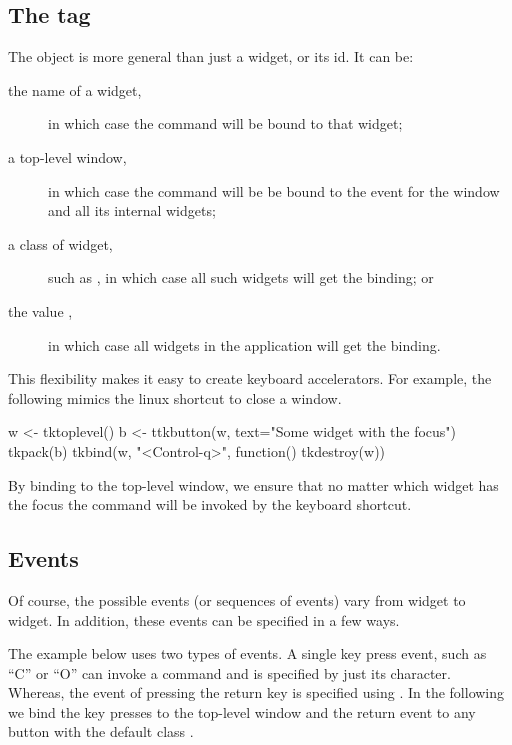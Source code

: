 \subsection{The tag}

The  object is more general than just a widget, or its
id. It can be:

\begin{description}
\item[the name of a widget,] in which case the command will be bound to that widget;
\item[a top-level window,] in which case the command will be be bound
  to the event for the window and all its internal widgets;
\item[a class of widget,] such as , in which case all
  such widgets will get the binding; or
\item[the value ,] in which case all widgets in the
  application will get the binding.
\end{description}

This flexibility makes it easy to create keyboard accelerators. For
example, the following mimics the linux shortcut  to
close a window.
\begin{Schunk}
\begin{Sinput}
 w <- tktoplevel()
 b <- ttkbutton(w, text="Some widget with the focus")
 tkpack(b)
 tkbind(w, "<Control-q>", function() tkdestroy(w))
\end{Sinput}
\end{Schunk}
%
By binding to the top-level window, we ensure that no matter which
widget has the focus the command will be invoked by the keyboard shortcut.


\subsection{Events}
\label{sec:tcltk:events}

Of course, the possible events (or sequences of events) vary from widget to
widget. In addition, these events can be specified in a few ways. 

The example below uses two types of events. A single key press event, such as
``C'' or ``O'' can invoke a command and is specified by just its
character. Whereas, the event of pressing the return key is specified
using . In the following we bind the key presses to the
top-level window and the return event to any button with the default
class .

